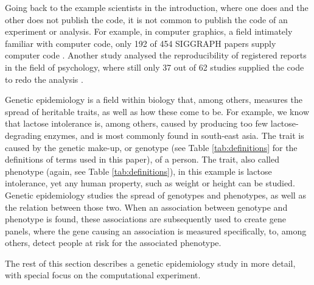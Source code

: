 
Going back to the example scientists in the introduction,
where one does and the other does not publish the code,
it is not common to publish the code of an experiment or analysis.
For example, in computer graphics, 
a field intimately familiar with computer code,
only 192 of 454 SIGGRAPH papers supply computer code \cite{bonneel2020code}.
Another study analysed the reproducibility of registered reports
in the field of psychology, 
where still only 37 out of 62 studies supplied the code 
to redo the analysis \cite{obels2020analysis}.


Genetic epidemiology is a field within biology that, among 
others, measures the spread of heritable traits,
as well as how these come to be.
For example, we know that lactose intolerance is, among others,
caused by producing too few lactose-degrading enzymes,
and is most commonly found in south-east asia.
The trait is caused by the genetic make-up, 
or genotype 
(see Table \ref{tab:definitions} for the definitions of terms used in this paper), 
of a person.
The trait, also called phenotype (again, see Table \ref{tab:definitions}), 
in this example is lactose intolerance,
yet any human property, such as weight or height can be studied.
Genetic epidemiology studies the spread of genotypes and phenotypes,
as well as the relation between those two.
When an association between genotype and phenotype is found,
these associations are subsequently used to 
create gene panels, where the gene causing 
an association is measured specifically, to, among others,
detect people at risk for the associated phenotype.

The rest of this section describes a genetic epidemiology study 
in more detail, with special focus on the computational experiment.

